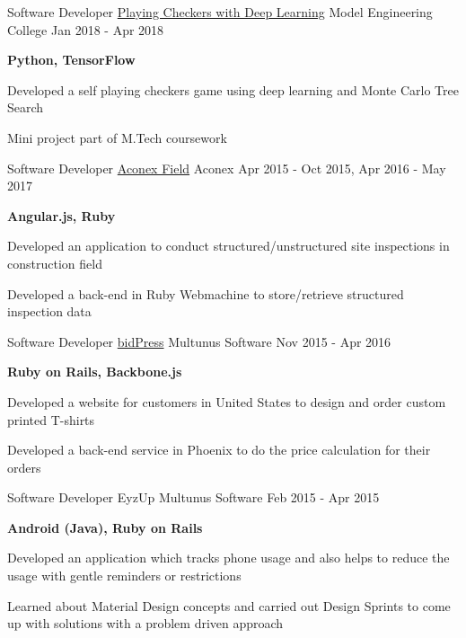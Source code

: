\begin{cventries} 
  \cventry
    {Software Developer}
    {\href{}{Playing Checkers with Deep Learning}}
    {Model Engineering College}
    {Jan 2018 - Apr 2018}
    {
      \begin{cvitems}
        \item {\textbf{Python, TensorFlow}}
        \item {Developed a self playing checkers game using deep learning and Monte Carlo Tree Search}
        \item {Mini project part of M.Tech coursework}
      \end{cvitems}
    }
  \cventry
    {Software Developer}
    {\href{https://www.aconex.com/support/aconex-field}{Aconex Field}}
    {Aconex}
    {Apr 2015 - Oct 2015, Apr 2016 - May 2017}
    {
      \begin{cvitems}
        \item {\textbf{Angular.js, Ruby}}
        \item {Developed an application to conduct structured/unstructured site inspections in construction field}
        \item {Developed a back-end in Ruby Webmachine to store/retrieve structured inspection data}
      \end{cvitems}
    }
  \cventry
    {Software Developer}
    {\href{https://www.bidpress.com/}{bidPress}}
    {Multunus Software}
    {Nov 2015 - Apr 2016}
    {
      \begin{cvitems}
        \item {\textbf{Ruby on Rails, Backbone.js}}
        \item {Developed a website for customers in United States to design and order custom printed T-shirts}
        \item {Developed a back-end service in Phoenix to do the price calculation for their orders}
      \end{cvitems}
    }
  \cventry
    {Software Developer}
    {EyzUp}
    {Multunus Software}
    {Feb 2015 - Apr 2015}
    {
      \begin{cvitems}
        \item {\textbf{Android (Java), Ruby on Rails}}
        \item {Developed an application which tracks phone usage and also helps to reduce the usage with gentle reminders or restrictions}
        \item {Learned about Material Design concepts and carried out Design Sprints to come up with solutions with a problem driven approach}

\end{cvitems}}
\end{cventries}

